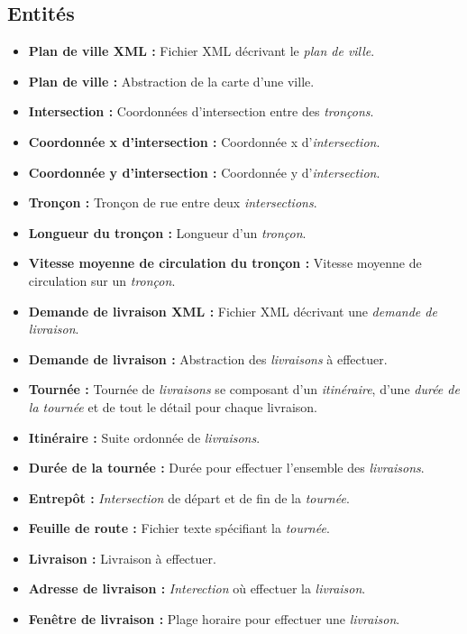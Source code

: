\documentclass[10pt,a4paper]{book}
\begin{document}
\subsection{Entités}
\begin{itemize}
\item \textbf{Plan de ville XML :} Fichier XML décrivant le \textit{plan de ville}. \vskip1mm
\item \textbf{Plan de ville :} Abstraction de la carte d'une ville. \vskip1mm
\item \textbf{Intersection :} Coordonnées d'intersection entre des \textit{tronçons}. \vskip1mm
\item \textbf{Coordonnée x d'intersection :} Coordonnée x d'\textit{intersection}. \vskip1mm
\item \textbf{Coordonnée y d'intersection :} Coordonnée y d'\textit{intersection}. \vskip1mm
\item \textbf{Tronçon :} Tronçon de rue entre deux \textit{intersections}. \vskip1mm
\item \textbf{Longueur du tronçon :} Longueur d'un \textit{tronçon}. \vskip1mm
\item \textbf{Vitesse moyenne de circulation du tronçon :} Vitesse moyenne de circulation sur un \textit{tronçon}. \vskip1mm
\item \textbf{Demande de livraison XML :} Fichier XML décrivant une \textit{demande de livraison}. \vskip1mm
\item \textbf{Demande de livraison :} Abstraction des \textit{livraisons} à effectuer. \vskip1mm
\item \textbf{Tournée :} Tournée de \textit{livraisons} se composant d'un \textit{itinéraire}, d'une \textit{durée de la tournée} et de tout le détail pour chaque livraison. \vskip1mm
\item \textbf{Itinéraire :} Suite ordonnée de \textit{livraisons}. \vskip1mm
\item \textbf{Durée de la tournée :} Durée pour effectuer l'ensemble des \textit{livraisons}. \vskip1mm
\item \textbf{Entrepôt :} \textit{Intersection} de départ et de fin de la \textit{tournée}. \vskip1mm
\item \textbf{Feuille de route :} Fichier texte spécifiant la \textit{tournée}. \vskip1mm
\item \textbf{Livraison :} Livraison à effectuer. \vskip1mm
\item \textbf{Adresse de livraison :} \textit{Interection} où effectuer la \textit{livraison}. \vskip1mm
\item \textbf{Fenêtre de livraison :} Plage horaire pour effectuer une \textit{livraison}. \vskip1mm

\end{itemize}
\end{document}
